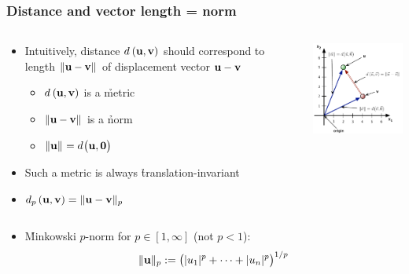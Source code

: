 \documentclass[t]{beamer} %
\begin{document}
\begin{frame}
  \frametitle{Distance and vector length = norm}

  \begin{columns}[T]
    \begin{column}{50mm}
      \begin{itemize}
      \item<1-> Intuitively, distance $\dist{\vu}{\vv}$ should correspond to
        length $\norm{\vu-\vv}$ of displacement vector $\vu - \vv$
        \begin{itemize}
        \item $\dist{\vu}{\vv}$ is a \h{metric}
        \item $\norm{\vu-\vv}$ is a \h{norm}
        \item $\norm{\vu} = \bigdist{\vu}{\vnull}$
        \end{itemize}
      \item<2-> Such a metric is always \h{translation-invariant}%
        \gap
      \item<3-> $\dist[p]{\vu}{\vv} = \norm[p]{\vu-\vv}$
      \end{itemize}
    \end{column}
    \begin{column}{50mm}
      \includegraphics[width=50mm]{img/2_distance_norm}
    \end{column}
  \end{columns}

  \begin{itemize}
  \item<3-> \h{Minkowski $p$-norm} for $p\in [1,\infty]$ (not $p < 1$):
    \[
    \norm[p]{\vu} \coloneq \bigl(\abs{u_1}^p + \dots + \abs{u_n}^p\bigr)^{1/p}
    \]
  \end{itemize}
\end{frame}
\end{document}
